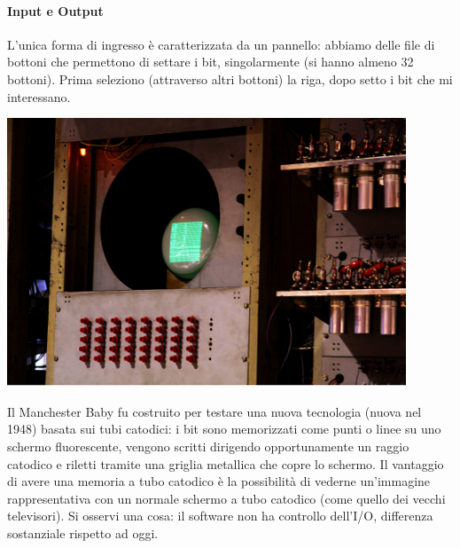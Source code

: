 \documentclass[11pt]{report}
\theoremstyle{definition}
\begin{document}
\paragraph{Input e Output} L'unica forma di ingresso è caratterizzata da un pannello: abbiamo delle file di bottoni che permettono di settare i bit, singolarmente (si hanno almeno 32 bottoni). Prima seleziono (attraverso altri bottoni) la riga, dopo setto i bit che mi interessano.
\begin{center}
\includegraphics{img/3.PNG}
\end{center}
Il Manchester Baby fu costruito per testare una nuova tecnologia (nuova nel 1948) basata sui tubi catodici: i bit sono memorizzati come punti o linee su uno schermo fluorescente, vengono scritti dirigendo opportunamente un raggio catodico e riletti tramite una griglia metallica che copre lo schermo. Il vantaggio di avere una memoria a tubo catodico è la possibilità di vederne un'immagine rappresentativa con un normale schermo a tubo catodico (come quello dei vecchi televisori). Si osservi una cosa: il software non ha controllo dell'I/O, differenza sostanziale rispetto ad oggi.
\end{document}
